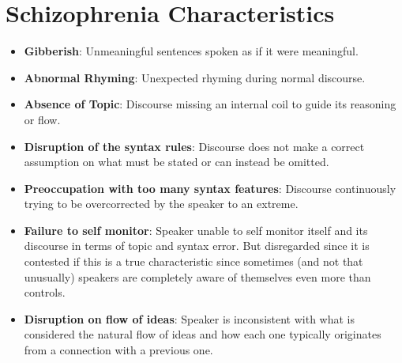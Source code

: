 \documentclass{Paper_Summary}
\begin{document}
\section{Schizophrenia Characteristics}
    \begin{itemize}
        \item \textbf{Gibberish}: Unmeaningful sentences spoken as if it were meaningful.
        \item \textbf{Abnormal Rhyming}: Unexpected rhyming during normal discourse.
        \item \textbf{Absence of Topic}: Discourse missing an internal coil to guide its reasoning or flow.
        \item \textbf{Disruption of the syntax rules}: Discourse does not make a correct assumption on what must be stated or can instead be omitted.
        \item \textbf{Preoccupation with too many syntax features}: Discourse continuously trying to be overcorrected by the speaker to an extreme.
        \item \textbf{Failure to self monitor}: Speaker unable to self monitor itself and its discourse in terms of topic and syntax error. But disregarded since it is contested if this is a true characteristic since sometimes (and not that unusually) speakers are completely aware of themselves even more than controls.
        \item \textbf{Disruption on flow of ideas}: Speaker is inconsistent with what is considered the natural flow of ideas and how each one typically originates from a connection with a previous one.
    \end{itemize}
\end{document}
